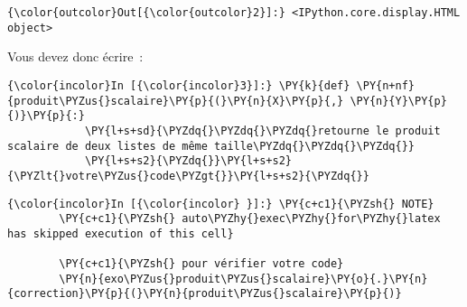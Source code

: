 \begin{Verbatim}[commandchars=\\\{\}]
{\color{outcolor}Out[{\color{outcolor}2}]:} <IPython.core.display.HTML object>
\end{Verbatim}
            
    Vous devez donc écrire~:

    \begin{Verbatim}[commandchars=\\\{\}]
{\color{incolor}In [{\color{incolor}3}]:} \PY{k}{def} \PY{n+nf}{produit\PYZus{}scalaire}\PY{p}{(}\PY{n}{X}\PY{p}{,} \PY{n}{Y}\PY{p}{)}\PY{p}{:} 
            \PY{l+s+sd}{\PYZdq{}\PYZdq{}\PYZdq{}retourne le produit scalaire de deux listes de même taille\PYZdq{}\PYZdq{}\PYZdq{}}
            \PY{l+s+s2}{\PYZdq{}}\PY{l+s+s2}{\PYZlt{}votre\PYZus{}code\PYZgt{}}\PY{l+s+s2}{\PYZdq{}}
\end{Verbatim}


    \begin{Verbatim}[commandchars=\\\{\}]
{\color{incolor}In [{\color{incolor} }]:} \PY{c+c1}{\PYZsh{} NOTE}
        \PY{c+c1}{\PYZsh{} auto\PYZhy{}exec\PYZhy{}for\PYZhy{}latex has skipped execution of this cell}
        
        \PY{c+c1}{\PYZsh{} pour vérifier votre code}
        \PY{n}{exo\PYZus{}produit\PYZus{}scalaire}\PY{o}{.}\PY{n}{correction}\PY{p}{(}\PY{n}{produit\PYZus{}scalaire}\PY{p}{)}
\end{Verbatim}



    
    
    
